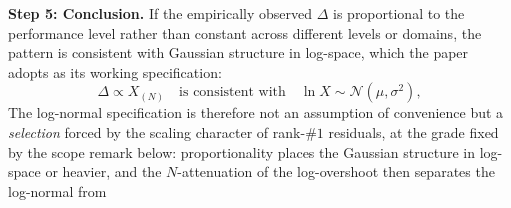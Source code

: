 \documentclass{article}
\begin{document}
\medskip
\noindent\textbf{Step 5: Conclusion.}\;
If the empirically observed $\Delta$ is proportional to the performance
level rather than constant across different levels or domains, the pattern is consistent with Gaussian structure in log-space, which the paper adopts as its working specification:
\begin{equation}\label{eq:deduction}
  \Delta \propto X_{(N)} \quad\text{is consistent with}\quad \ln X \sim \mathcal{N}(\mu,\sigma^2),
\end{equation}
The log-normal specification is therefore not an assumption of convenience
but a \emph{selection} forced by the scaling character of rank-$\#1$
residuals, at the grade fixed by the scope remark below: proportionality
places the Gaussian structure in log-space or heavier, and the
$N$-attenuation of the log-overshoot then separates the log-normal from
\end{document}
